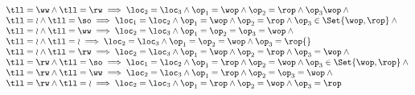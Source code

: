 \begin{lem}
\[\begin{array}{@{}l@{}}
            \tll = \ww \land \tll = \rw \implies \loc_{2} = \loc_{3} \land \op_{1} = \wop \land \op_{2} = \rop \land \op_{3} \wop \land {} \\
            \tll = \wr \land \tll = \so \implies \loc_{1} = \loc_{2} \land \op_{1} = \wop \land \op_{2} = \rop \land \op_{3} \in \Set{\wop, \rop} \land {} \\
            \tll = \wr \land \tll = \ww \implies \loc_{2} = \loc_{3} \land \op_{1} = \op_{2} = \op_{3} = \wop \land {} \\
            \tll = \wr \land \tll = \wr \implies \loc_{2} = \loc_{3} \land \op_{1} = \op_{2} = \wop \land \op_{3} = \rop {} \\
            \tll = \wr \land \tll = \rw \implies \loc_{2} = \loc_{3} \land \op_{1} = \wop \land \op_{2} = \rop \land \op_{3} = \wop \land {} \\
            \tll = \rw \land \tll = \so \implies \loc_{1} = \loc_{2} \land \op_{1} = \rop \land \op_{2} = \wop \land \op_{3} \in \Set{\wop, \rop} \land {} \\
            \tll = \rw \land \tll = \ww \implies \loc_{2} = \loc_{3} \land \op_{1} = \rop \land \op_{2} = \op_{3} = \wop \land {} \\
            \tll = \rw \land \tll = \wr \implies \loc_{2} = \loc_{3} \land \op_{1} = \rop \land \op_{2} = \wop \land \op_{3} = \rop 
        \end{array}
    \]
\end{lem}




